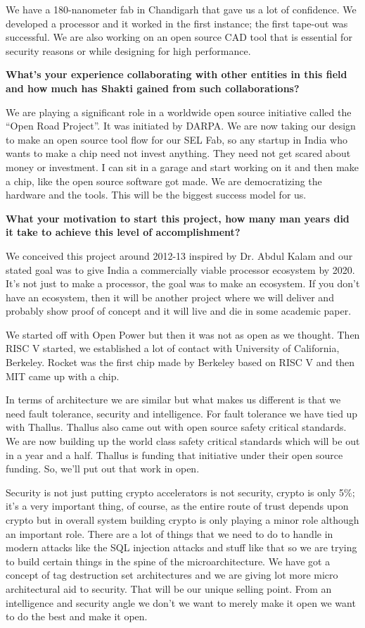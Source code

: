 \begin{multicols}{2}
We have a 180-nanometer fab in Chandigarh that gave us a lot of confidence. We developed a processor and it worked in the first instance; the first tape-out was successful. We are also working on an open source CAD tool that is essential for security reasons or while designing for high performance.

{\bf What's your experience collaborating with other entities in this field and how much has Shakti gained from such collaborations? }

We are playing a significant role in a worldwide open source initiative called the ``Open Road Project''.  It was initiated by DARPA. We are now taking our design to make an open source tool flow for our SEL Fab, so any startup in India who wants to make a chip need not invest anything. They need not get scared about money or investment. I can sit in a garage and start working on it and then make a chip, like the open source software got made. We are democratizing the hardware and the tools. This will be the biggest success model for us.

{\bf What your motivation to start this project, how many man years did it take to achieve this level of accomplishment?}

We conceived this project around 2012-13 inspired by Dr. Abdul Kalam and our stated goal was to give India a commercially viable processor ecosystem by 2020. It's not just to make a processor, the goal was to make an ecosystem. If you don't have an ecosystem, then it will be another project where we will deliver and probably show proof of concept and it will live and die in some academic paper. 

We started off with Open Power but then it was not as open as we thought. Then RISC V started, we established a lot of contact with University of California, Berkeley. Rocket was the first chip made by Berkeley based on RISC V and then MIT came up with a chip.

In terms of architecture we are similar but what makes us different is that we need fault tolerance, security and intelligence. For fault tolerance we have tied up with Thallus. Thallus also came out with open source safety critical standards.  We are now building up the world class safety critical standards which will be out in a year and a half.  Thallus is funding that initiative under their open source funding.  So, we'll put out that work in open.

Security is not just putting crypto accelerators is not security, crypto is only 5\%; it's a very important thing, of course, as the entire route of trust depends upon crypto but in overall system building crypto is only playing a minor role although an important role. There are a lot of things that we need to do to handle in modern attacks like the SQL injection attacks and stuff like that so we are trying to build certain things in the spine of the microarchitecture. We have got a concept of tag destruction set architectures and we are giving lot more micro architectural aid to security. That will be our unique selling point. From an intelligence and security angle we don't we want to merely make it open we want to do the best and make it open.


\end{multicols}
